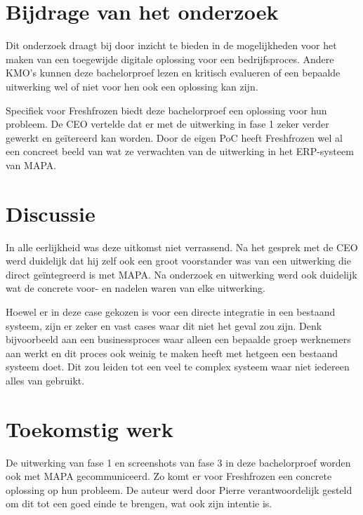 \section{Bijdrage van het onderzoek}

Dit onderzoek draagt bij door inzicht te bieden in de mogelijkheden voor het maken van een toegewijde digitale oplossing voor een bedrijfsproces. Andere KMO's kunnen deze bachelorproef lezen en kritisch evalueren of een bepaalde uitwerking wel of niet voor hen ook een oplossing kan zijn.

Specifiek voor Freshfrozen biedt deze bachelorproef een oplossing voor hun probleem. De CEO vertelde dat er met de uitwerking in fase 1 zeker verder gewerkt en geïtereerd kan worden. Door de eigen PoC heeft Freshfrozen wel al een concreet beeld van wat ze verwachten van de uitwerking in het ERP-systeem van MAPA. 

\section{Discussie}

In alle eerlijkheid was deze uitkomst niet verrassend. Na het gesprek met de CEO werd duidelijk dat hij zelf ook een groot voorstander was van een uitwerking die direct geïntegreerd is met MAPA. Na onderzoek en uitwerking werd ook duidelijk wat de concrete voor- en nadelen waren van elke uitwerking. 

Hoewel er in deze case gekozen is voor een directe integratie in een bestaand systeem, zijn er zeker en vast cases waar dit niet het geval zou zijn. Denk bijvoorbeeld aan een businessproces waar alleen een bepaalde groep werknemers aan werkt en dit proces ook weinig te maken heeft met hetgeen een bestaand systeem doet. Dit zou leiden tot een veel te complex systeem waar niet iedereen alles van gebruikt.

\section{Toekomstig werk}

De uitwerking van fase 1 en screenshots van fase 3 in deze bachelorproef worden ook met MAPA gecommuniceerd. Zo komt er voor Freshfrozen een concrete oplossing op hun probleem. De auteur werd door Pierre verantwoordelijk gesteld om dit tot een goed einde te brengen, wat ook zijn intentie is.


